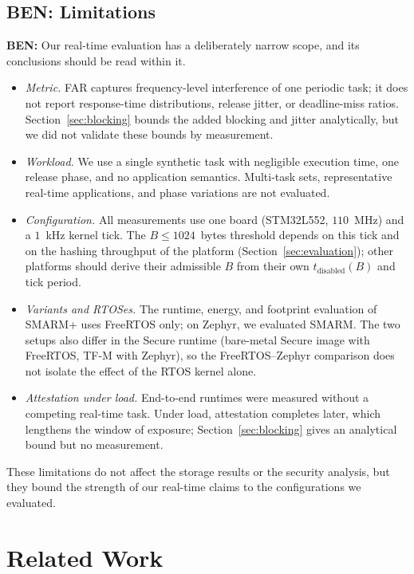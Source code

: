 \documentclass{ieeeaccess}
\DeclareRobustCommand{\ben}[1]{{\color{BENcolor}\textbf{BEN:} #1}}
\newcommand{\rtsmarm}{SMARM+\xspace}
\begin{document}
\subsection{\ben{Limitations}}
\label{sec:limitations}
\ben{Our real-time evaluation has a deliberately narrow scope, and its conclusions should be read within it.
\begin{itemize}
  \item \emph{Metric.} FAR captures frequency-level interference of one periodic task; it does not report response-time distributions, release jitter, or deadline-miss ratios. Section~\ref{sec:blocking} bounds the added blocking and jitter analytically, but we did not validate these bounds by measurement.
  \item \emph{Workload.} We use a single synthetic task with negligible execution time, one release phase, and no application semantics. Multi-task sets, representative real-time applications, and phase variations are not evaluated.
  \item \emph{Configuration.} All measurements use one board (STM32L552, $110$~MHz) and a $1$~kHz kernel tick. The $B \le 1024$~bytes threshold depends on this tick and on the hashing throughput of the platform (Section~\ref{sec:evaluation}); other platforms should derive their admissible $B$ from their own $t_{\text{disabled}}(B)$ and tick period.
  \item \emph{Variants and RTOSes.} The runtime, energy, and footprint evaluation of \rtsmarm uses FreeRTOS only; on Zephyr, we evaluated SMARM. The two setups also differ in the Secure runtime (bare-metal Secure image with FreeRTOS, TF-M with Zephyr), so the FreeRTOS--Zephyr comparison does not isolate the effect of the RTOS kernel alone.
  \item \emph{Attestation under load.} End-to-end runtimes were measured without a competing real-time task. Under load, attestation completes later, which lengthens the window of exposure; Section~\ref{sec:blocking} gives an analytical bound but no measurement.
\end{itemize}
These limitations do not affect the storage results or the security analysis, but they bound the strength of our real-time claims to the configurations we evaluated.}


\section{Related Work}
\label{sec:related}
\end{document}
